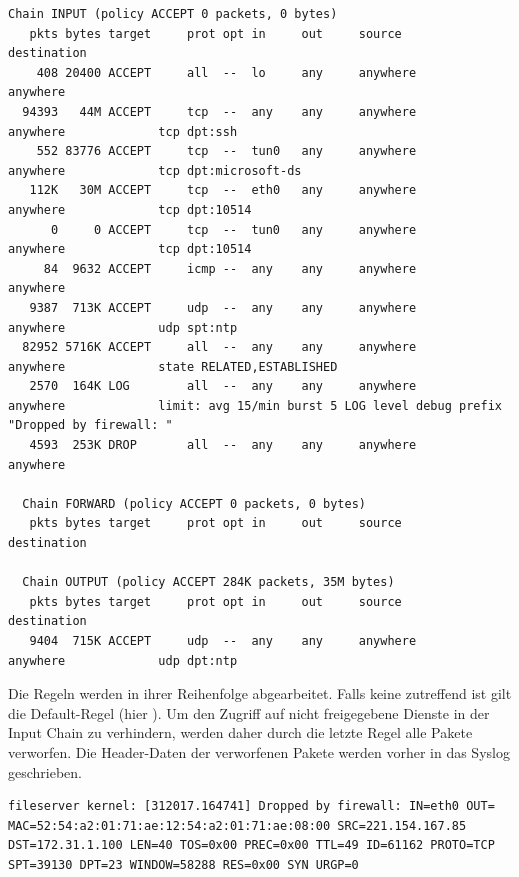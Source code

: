 \begin{lstlisting}[label=code:smbconf5,caption=Ausgabe von iptables -L -v]
  Chain INPUT (policy ACCEPT 0 packets, 0 bytes)
   pkts bytes target     prot opt in     out     source               destination
    408 20400 ACCEPT     all  --  lo     any     anywhere             anywhere
  94393   44M ACCEPT     tcp  --  any    any     anywhere             anywhere             tcp dpt:ssh
    552 83776 ACCEPT     tcp  --  tun0   any     anywhere             anywhere             tcp dpt:microsoft-ds
   112K   30M ACCEPT     tcp  --  eth0   any     anywhere             anywhere             tcp dpt:10514
      0     0 ACCEPT     tcp  --  tun0   any     anywhere             anywhere             tcp dpt:10514
     84  9632 ACCEPT     icmp --  any    any     anywhere             anywhere
   9387  713K ACCEPT     udp  --  any    any     anywhere             anywhere             udp spt:ntp
  82952 5716K ACCEPT     all  --  any    any     anywhere             anywhere             state RELATED,ESTABLISHED
   2570  164K LOG        all  --  any    any     anywhere             anywhere             limit: avg 15/min burst 5 LOG level debug prefix "Dropped by firewall: "
   4593  253K DROP       all  --  any    any     anywhere             anywhere

  Chain FORWARD (policy ACCEPT 0 packets, 0 bytes)
   pkts bytes target     prot opt in     out     source               destination

  Chain OUTPUT (policy ACCEPT 284K packets, 35M bytes)
   pkts bytes target     prot opt in     out     source               destination
   9404  715K ACCEPT     udp  --  any    any     anywhere             anywhere             udp dpt:ntp
\end{lstlisting}

Die Regeln werden in ihrer Reihenfolge abgearbeitet. Falls keine zutreffend ist gilt die Default-Regel (hier ). Um den Zugriff auf nicht freigegebene Dienste in der Input Chain zu verhindern, werden daher durch die letzte Regel alle Pakete verworfen. Die Header-Daten der verworfenen Pakete werden vorher in das Syslog geschrieben.

\begin{lstlisting}[label=code:denyany,caption=Syslog Eintrag bei verworfenen Paketen]
  fileserver kernel: [312017.164741] Dropped by firewall: IN=eth0 OUT= MAC=52:54:a2:01:71:ae:12:54:a2:01:71:ae:08:00 SRC=221.154.167.85 DST=172.31.1.100 LEN=40 TOS=0x00 PREC=0x00 TTL=49 ID=61162 PROTO=TCP SPT=39130 DPT=23 WINDOW=58288 RES=0x00 SYN URGP=0
\end{lstlisting}

